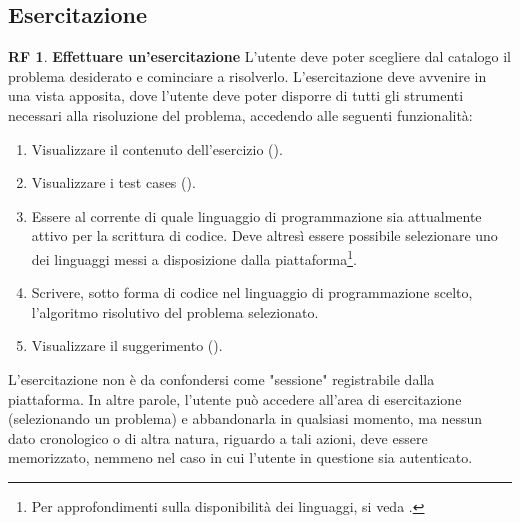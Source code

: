 \documentclass[11pt, a4paper]{article}
\theoremstyle{definition}
\newtheorem{funcreq}{RF} %
\begin{document}
\subsection{Esercitazione}
\begin{funcreq}
\label{exesession}
\textbf{Effettuare un'esercitazione }
L'utente deve poter scegliere dal catalogo il problema desiderato e cominciare
a risolverlo. L'esercitazione deve avvenire in una vista apposita, dove
l'utente deve poter disporre di tutti gli strumenti necessari alla risoluzione
del problema, accedendo alle seguenti funzionalità:
\begin{enumerate}
    \item Visualizzare il contenuto dell'esercizio (\textcolor{blue}{}).
    
    \item Visualizzare i test cases (\textcolor{blue}{}).

    \item Essere al corrente di quale linguaggio di programmazione sia
    attualmente attivo per la scrittura di codice. Deve altresì essere 
    possibile selezionare uno dei linguaggi messi a disposizione dalla
    piattaforma\footnote{Per approfondimenti sulla disponibilità dei
    linguaggi, si veda \textcolor{blue}{}.}.

    \item Scrivere, sotto forma di codice nel linguaggio di programmazione
    scelto, l'algoritmo risolutivo del problema selezionato.

    \item Visualizzare il suggerimento (\textcolor{blue}{}).
\end{enumerate}
L'esercitazione non è da confondersi come "sessione" registrabile dalla
piattaforma. In altre parole, l'utente può accedere all'area di esercitazione
(selezionando un problema) e abbandonarla in qualsiasi momento, ma nessun
dato cronologico o di altra natura, riguardo a tali azioni, deve essere memorizzato,
nemmeno nel caso in cui l'utente in questione sia autenticato.
\end{funcreq}


\end{document}

